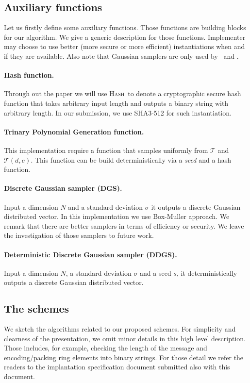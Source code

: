\documentclass{llncs}
\newcommand{\Tcal}{{\mathcal T}}
\newcommand{\ssntrukem}{{\sf{ss-ntru-kem}}}
\newcommand{\ssntrupke}{{\sf{ss-ntru-pke}}}
\newcommand{\hash}{{\textsc{Hash}}}
\newcommand{\<}{\langle}
\renewcommand{\>}{\rangle}
\begin{document}
\subsection{Auxiliary functions}
Let us firstly define some auxiliary functions. Those functions are building blocks for our algorithm.
We give a generic description for those functions.
Implementer may choose to use better (more secure
or more efficient) instantiations when and if they
are available.
Also note that Gaussian samplers are only used by \ssntrupke~and
\ssntrukem.

\paragraph{Hash function.} Through out the paper
we will use \hash~to denote a cryptographic secure hash function that takes arbitrary input length and
outputs a binary string with arbitrary length. In
our submission, we use \textsf{SHA3-512} for such
instantiation.


\paragraph{Trinary Polynomial Generation function.}
This implementation require a function that samples uniformly from 
$\Tcal$ and $\Tcal(d,e)$. This function can be build deterministically
 via a {\em seed} and a hash function.
 

\paragraph{Discrete Gaussian sampler (DGS).} Input a
dimension $N$ and a standard deviation $\sigma$ it outputs a discrete Gaussian distributed vector. In this implementation we use Box-Muller
approach. We remark that there are better samplers in terms of 
efficiency or security. We leave the investigation of those samplers
to future work.

\paragraph{Deterministic Discrete Gaussian sampler (DDGS).}Input a
dimension $N$, a standard deviation $\sigma$ and
a seed $s$, it deterministically outputs a discrete Gaussian distributed vector.


\subsection{The schemes}
We sketch the algorithms related to our proposed schemes. For simplicity
and clearness of the presentation, we omit minor details 
in this high level description. Those includes, for example, checking
the length of the message and encoding/packing ring elements into binary strings.
For those detail we refer the readers to the implantation specification
document submitted also with this document.
\end{document}
